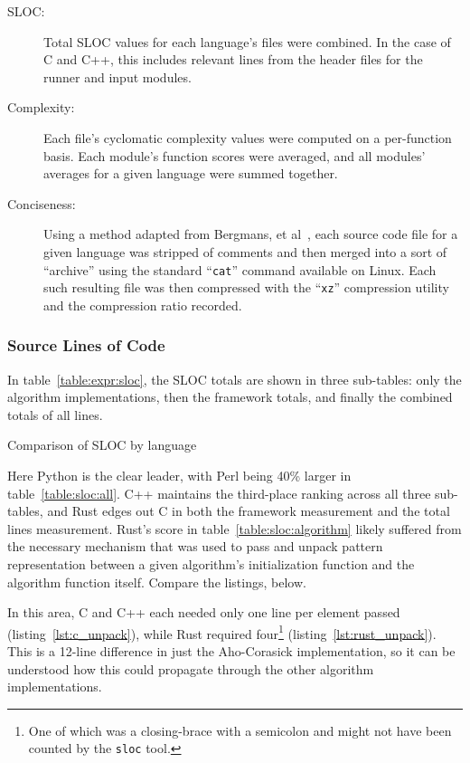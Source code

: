 \begin{description}
\item[SLOC:] Total SLOC values for each language's files were combined. In the case of C and C++, this includes relevant lines from the header files for the runner and input modules.
\item[Complexity:] Each file's cyclomatic complexity values were computed on a per-function basis. Each module's function scores were averaged, and all modules' averages for a given language were summed together.
\item[Conciseness:] Using a method adapted from Bergmans, et al~\cite{bergmans}, each source code file for a given language was stripped of comments and then merged into a sort of ``archive'' using the standard ``\texttt{cat}'' command available on Linux. Each such resulting file was then compressed with the ``\texttt{xz}'' compression utility and the compression ratio recorded.
\end{description}

\subsubsection{Source Lines of Code}

In table~\ref{table:expr:sloc}, the SLOC totals are shown in three sub-tables: only the algorithm implementations, then the framework totals, and finally the combined totals of all lines.

\begin{table}[!htb]

\caption{Comparison of SLOC by language}
\label{table:expr:sloc}
\end{table}

Here Python is the clear leader, with Perl being 40\% larger in table~\ref{table:sloc:all}. C++ maintains the third-place ranking across all three sub-tables, and Rust edges out C in both the framework measurement and the total lines measurement. Rust's score in table~\ref{table:sloc:algorithm} likely suffered from the necessary mechanism that was used to pass and unpack pattern representation between a given algorithm's initialization function and the algorithm function itself. Compare the listings, below.





In this area, C and C++ each needed only one line per element passed (listing~\ref{lst:c_unpack}), while Rust required four\footnote{One of which was a closing-brace with a semicolon and might not have been counted by the \texttt{sloc} tool.} (listing~\ref{lst:rust_unpack}). This is a 12-line difference in just the Aho-Corasick implementation, so it can be understood how this could propagate through the other algorithm implementations.

